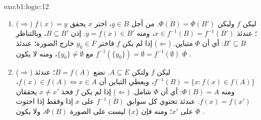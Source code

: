 \begin{solution}{exo:b1:logic:12}
\begin{enumerate}
  \item ($\Rightarrow$) ليكن $f$  وليكن $\Phi(B) =
        \Phi(B')$. من أجل $y \in B$، اختر $x$ يحقق $f(x) = y$؛ عندئذ $x
        \in f^{-1}(B) = f^{-1}(B')$، ومنه $y = f(x) \in B'$. إذن $B
        \subseteq B'$، وبالتناظر $B' \subseteq B$: أي أن $\Phi$
        متباين. ($\Leftarrow$) إذا لم يكن $f$  فاختر $y_0
        \in F$ خارج الصورة؛ عندئذ $f^{-1}(\{y_0\}) = \emptyset =
        f^{-1}(\emptyset)$ مع $\{y_0\} \neq \emptyset$، ومنه لا يكون $\Phi$
        .
  \item ($\Rightarrow$) ليكن $f$  ولتكن $A \subseteq E$.
        نضع $B = f(A)$؛ عندئذ $f^{-1}(B) = \{x : f(x) \in f(A)\}$، ويعطي
        التباين أن $f(x) \in f(A) \iff x \in A$، ومنه $\Phi(B) =
        A$: أي أن $\Phi$ شامل. ($\Leftarrow$) إذا لم يكن $f$
         فخذ $x \neq x'$ يحققان $f(x) = f(x')$. عندئذ تحتوي
        كل  سوابق $f^{-1}(B)$ على $x$ إذا وفقط إذا احتوت
        على $x'$؛ ومنه فإن $\{x\}$ ليست على الصورة $\Phi(B)$، ولا
        يكون $\Phi$ .
\end{enumerate}
\end{solution}

